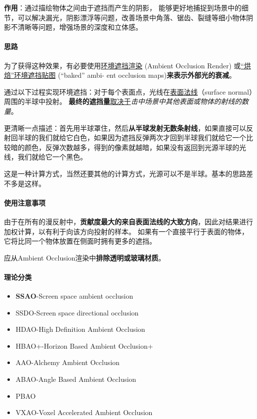 \documentclass[UTF8,a4paper,12pt]{ctexbook}
\begin{document}
			
			\textbf{作用}：通过描绘物体之间由于遮挡而产生的阴影， 能够更好地捕捉到场景中的细节，可以解决漏光，阴影漂浮等问题，改善场景中角落、锯齿、裂缝等细小物体阴影不清晰等问题，增强场景的深度和立体感。
			
			
			\paragraph{思路}
				为了获得这种效果，有必要使用\underline{环境遮挡渲染} (Ambient Occlusion Render) 或\underline{“烘焙”环境遮挡贴图} (“baked” ambi- ent occlusion maps)\textbf{来表示外部光的衰减}。
				
				通过以下过程实现环境遮挡：对于每个表面点，光线在\underline{表面法线}（surface normal）周围的半球中投射。 \textbf{最终的遮挡量}\underline{取决于}\textit{击中场景中其他表面或物体的射线的数量}。
			
				更清晰一点描述：首先用半球罩住，然后\textbf{从半球发射无数条射线}，如果直接可以反射回半球的我们就给它白色，如果因为遮挡反弹两次才回到半球我们就给它一个比较暗的颜色，反弹次数越多，得到的像素就越暗，如果没有返回到光源半球的光线，我们就给它一个黑色。
				
				这是一种计算方式，当然还要其他的计算方式，光源可以不是半球。基本的思路差不多是这样。
		
			    
			\paragraph{使用注意事项}
				由于在所有的漫反射中，\textbf{贡献度最大的来自表面法线的大致方向}，因此对结果进行加权计算，以有利于向该方向投射的样本。 如果有一个直接平行于表面的物体，它将比同一个物体放置在侧面时拥有更多的遮挡。
				
				应从Ambient Occlusion渲染中\textbf{排除透明或玻璃材质}。 
				
				
			\paragraph{理论分类}
				\begin{itemize}
					\item \textbf{SSAO}-Screen space ambient occlusion
					\item SSDO-Screen space directional occlusion
					\item HDAO-High Definition Ambient Occlusion
					\item HBAO+-Horizon Based Ambient Occlusion+
					\item AAO-Alchemy Ambient Occlusion
					\item ABAO-Angle Based Ambient Occlusion
					\item PBAO
					\item VXAO-Voxel Accelerated Ambient Occlusion
				\end{itemize}
		
\end{document}
